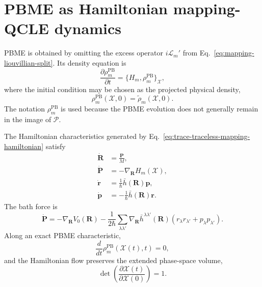 \documentclass[
  11pt,
  letterpaper,
  onehalfspacing,
  normalmargins,
  equalmargins,
  oneside
]{ut-thesis}
\begin{document}
\section{PBME as Hamiltonian mapping-QCLE dynamics}
\label{sec:pbme-hamiltonian-part-mapping-qcle}

PBME is obtained by omitting the excess operator
\(i\mathcal L_m'\) from Eq.~\eqref{eq:mapping-liouvillian-split}. Its density
equation is
\begin{equation}
\frac{\partial\rho_m^{\mathrm{PB}}}{\partial t}
=
\{H_m,\rho_m^{\mathrm{PB}}\}_{\boldsymbol{\mathcal X}},
\label{eq:pbme-density-equation}
\end{equation}
where the initial condition may be chosen as the projected physical density,
\begin{equation}
\rho_m^{\mathrm{PB}}(\boldsymbol{\mathcal X},0)
=
\tilde\rho_m(\boldsymbol{\mathcal X},0).
\label{eq:pbme-projected-initial-condition}
\end{equation}
The notation \(\rho_m^{\mathrm{PB}}\) is used because the PBME evolution does
not generally remain in the image of \(\mathcal P\).

The Hamiltonian characteristics generated by
Eq.~\eqref{eq:trace-traceless-mapping-hamiltonian} satisfy
\begin{align}
\dot{\mathbf R}
&=
\frac{\mathbf P}{M},
\label{eq:pbme-r-equation}
\\
\dot{\mathbf P}
&=
-\nabla_{\mathbf R}H_m(\boldsymbol{\mathcal X}),
\label{eq:pbme-p-equation}
\\
\dot{\mathbf r}
&=
\frac{1}{\hbar}
\bar h(\mathbf R)\mathbf p,
\label{eq:pbme-r-mapping-vector-equation}
\\
\dot{\mathbf p}
&=
-\frac{1}{\hbar}
\bar h(\mathbf R)\mathbf r.
\label{eq:pbme-p-mapping-vector-equation}
\end{align}
The bath force is
\begin{equation}
\dot{\mathbf P}
=
-\nabla_{\mathbf R}V_0(\mathbf R)
-
\frac{1}{2\hbar}
\sum_{\lambda\lambda'}
\nabla_{\mathbf R}\bar h^{\lambda\lambda'}(\mathbf R)
\left(
 r_\lambda r_{\lambda'}
+
 p_\lambda p_{\lambda'}
\right).
\label{eq:pbme-p-equation-expanded}
\end{equation}
Along an exact PBME characteristic,
\begin{equation}
\frac{d}{dt}
\rho_m^{\mathrm{PB}}
\left(
\boldsymbol{\mathcal X}(t),t
\right)
=
0,
\label{eq:pbme-density-constant-characteristics}
\end{equation}
and the Hamiltonian flow preserves the extended phase-space volume,
\begin{equation}
\det\left(
\frac{\partial\boldsymbol{\mathcal X}(t)}
{\partial\boldsymbol{\mathcal X}(0)}
\right)
=
1.
\label{eq:pbme-volume-preservation}
\end{equation}
\end{document}
